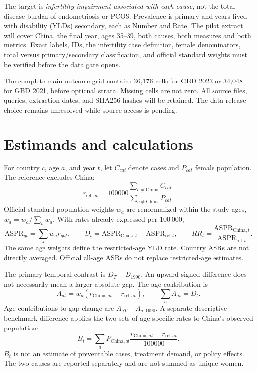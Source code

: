 \documentclass[11pt,a4paper]{article}
\begin{document}
The target is \emph{infertility impairment associated with each cause}, not the total disease burden of endometriosis or PCOS. Prevalence is primary and years lived with disability (YLDs) secondary, each as Number and Rate. The pilot extract will cover China, the final year, ages 35--39, both causes, both measures and both metrics. Exact labels, IDs, the infertility case definition, female denominators, total versus primary/secondary classification, and official standard weights must be verified before the data gate opens.

The complete main-outcome grid contains 36,176 cells for GBD 2023 or 34,048 for GBD 2021, before optional strata. Missing cells are not zero. All source files, queries, extraction dates, and SHA256 hashes will be retained. The data-release choice remains unresolved while source access is pending.

\section{Estimands and calculations}
For country $c$, age $a$, and year $t$, let $C_{cat}$ denote cases and $P_{cat}$ female population. The reference excludes China:
\[
 r_{\mathrm{ref},at}=100000
 \frac{\sum_{c\ne\mathrm{China}}C_{cat}}
      {\sum_{c\ne\mathrm{China}}P_{cat}}.
\]
Official standard-population weights $w_a$ are renormalized within the study ages, $\widetilde w_a=w_a/\sum_a w_a$. With rates already expressed per 100,000,
\[
 \mathrm{ASPR}_{gt}=\sum_a\widetilde w_a r_{gat},\qquad
 D_t=\mathrm{ASPR}_{\mathrm{China},t}-\mathrm{ASPR}_{\mathrm{ref},t},
 \qquad RR_t=\frac{\mathrm{ASPR}_{\mathrm{China},t}}{\mathrm{ASPR}_{\mathrm{ref},t}}.
\]
The same age weights define the restricted-age YLD rate. Country ASRs are not directly averaged. Official all-age ASRs do not replace restricted-age estimates.

The primary temporal contrast is $D_T-D_{1990}$. An upward signed difference does not necessarily mean a larger absolute gap. The age contribution is
\[
 A_{at}=\widetilde w_a(r_{\mathrm{China},at}-r_{\mathrm{ref},at}),
 \qquad \sum_a A_{at}=D_t.
\]
Age contributions to gap change are $A_{aT}-A_{a,1990}$. A separate descriptive benchmark difference applies the two sets of age-specific rates to China's observed population:
\[
 B_t=\sum_a P_{\mathrm{China},at}
 \frac{r_{\mathrm{China},at}-r_{\mathrm{ref},at}}{100000}.
\]
$B_t$ is not an estimate of preventable cases, treatment demand, or policy effects. The two causes are reported separately and are not summed as unique women.
\end{document}
